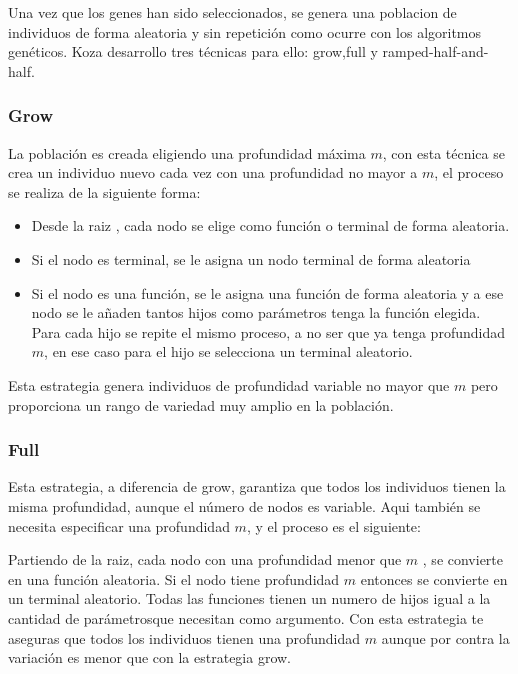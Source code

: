 \documentclass[12pt]{article} \usepackage[utf8x]{inputenc}
\begin{document}
Una vez que los genes han sido seleccionados, se genera una 
poblacion de individuos de forma aleatoria y sin repetición 
como ocurre con los algoritmos genéticos. Koza desarrollo 
tres técnicas para ello: grow,full y ramped-half-and-half.

\subsubsection{Grow}

La población es creada eligiendo una profundidad máxima \(m\),
con esta técnica se crea un individuo nuevo cada vez con una
profundidad no mayor a \(m\),
el proceso se realiza de la siguiente forma:
\begin{itemize}
\item Desde la raiz , cada nodo se elige como función o terminal de
  forma aleatoria.
\item Si el nodo es terminal, se le asigna un nodo terminal de forma
  aleatoria
\item Si el nodo es una función, se le asigna una función de forma
  aleatoria y a ese nodo se le añaden tantos hijos como parámetros
  tenga la función elegida. Para cada hijo se repite el mismo proceso,
  a no ser que ya tenga profundidad \(m\),
  en ese caso para el hijo se selecciona un terminal aleatorio.
\end{itemize}

Esta estrategia genera individuos de profundidad variable no mayor que
\(m\) pero proporciona un rango de variedad muy amplio en la población.

\subsubsection{Full}

Esta estrategia, a diferencia de grow, garantiza que todos los
individuos tienen la misma profundidad, aunque el número de nodos es
variable. Aqui también se necesita especificar una profundidad \(m\),
y el proceso es el siguiente:

Partiendo de la raiz, cada nodo con una profundidad menor que \(m\)
, se convierte en una función aleatoria. Si el nodo tiene profundidad
\(m\) entonces se convierte en un terminal aleatorio. Todas las funciones 
tienen un numero de hijos igual a la cantidad de parámetrosque necesitan 
como argumento. Con esta estrategia te aseguras que todos los individuos 
tienen una profundidad \(m\) aunque por contra la variación es menor 
que con la estrategia grow.\\
 
\end{document}
